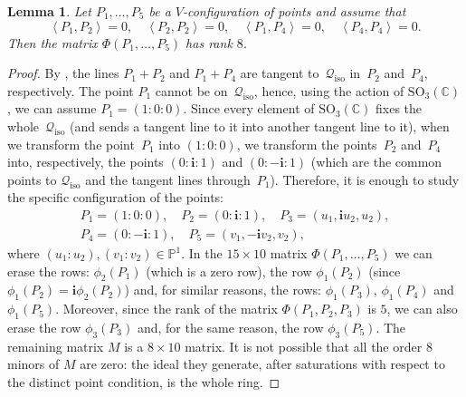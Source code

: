 \documentclass{amsart}
\theoremstyle{plain}
\newtheorem{lemma}{Lemma}[section]
\theoremstyle{definition}
\newcommand{\p}{\mathbb{P}}
\newcommand{\iso}{\mathcal{Q}_{\mathrm{iso}}}
\newcommand{\scl}[2]{\left\langle {#1}, {#2} \right\rangle}
\newcommand{\iii}{\textbf{i}}
\begin{document}
\begin{lemma}
\label{lemma:special_case_rank_8}
Let $P_1, \dots, P_5$ be a $V$-configuration of points and assume that
\[
\scl{P_1}{P_2}=0, \quad \scl{P_2}{P_2}=0, \quad \scl{P_1}{P_4}=0,
\quad \scl{P_4}{P_4}=0.
\]
Then the matrix $\Phi(P_1, \dots, P_5)$ has rank $8$.
\end{lemma}
\begin{proof}
By ,
the lines $P_1+P_2$ and $P_1+P_4$ are tangent to~$\iso$ in~$P_2$ and~$P_4$, respectively. The point $P_1$ cannot be on~$\iso$, hence, using the
action of $\mathrm{SO}_3(\mathbb{C})$, we can assume $P_1 = (1: 0: 0)$.
Since every element of $\mathrm{SO}_3(\mathbb{C})$ fixes the whole~$\iso$ (and sends a tangent line to it into another tangent line to it), when we transform the point~$P_1$
into $(1: 0: 0)$, we transform the points~$P_2$ and~$P_4$ into, respectively,
the points $(0: \iii: 1)$ and $(0: -\iii: 1)$ (which are the common points to
$\iso$ and the tangent lines through~$P_1$).
Therefore, it is enough to study the
specific configuration of the points:
%
\begin{gather*}
P_1 = (1: 0: 0), \quad P_2=(0: \iii: 1), \quad P_3=(u_1, \iii u_2, u_2), \\
P_4 = (0: -\iii: 1), \quad P_5 = (v_1, -\iii v_2, v_2),
\end{gather*}
%
where $(u_1: u_2), (v_1: v_2) \in \p^1$.
In the $15\times 10$ matrix $\Phi(P_1, \dots, P_5)$ we can erase the
rows: $\phi_2(P_1)$ (which is a zero row), the row $\phi_1(P_2)$
(since $\phi_1(P_2)=\iii\phi_2(P_2)$) and, for similar reasons, the
rows: $\phi_1(P_3)$, $\phi_1(P_4)$ and $\phi_1(P_5)$.
Moreover, since the rank of the matrix $\Phi(P_1, P_2, P_3)$ is $5$,
we can also erase the row $\phi_3(P_3)$ and, for the same reason, the
row $\phi_3(P_5)$. The remaining matrix $M$ is a $8\times 10$ matrix.
It is not possible that all the order $8$ minors
of $M$ are zero: the ideal they generate, after saturations with respect to the distinct point condition, is the whole ring.
\end{proof}
\end{document}
